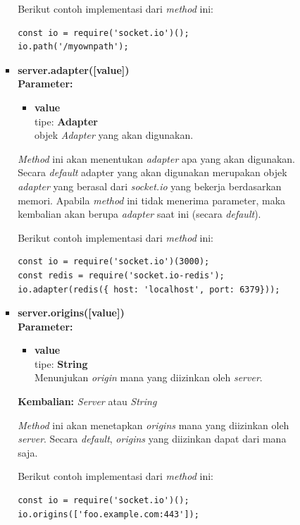 \documentclass[a4paper,twoside]{article}
\begin{document}
\begin{enumerate}
\begin{enumerate}
\begin{enumerate}
\begin{itemize}
					Berikut contoh implementasi dari \textit{method} ini:
\begin{lstlisting}
const io = require('socket.io')();
io.path('/myownpath');
\end{lstlisting}
					
					\item \textbf{server.adapter([value])} \\
					\textbf{Parameter:}
					\begin{itemize}
						\item \textbf{value} \\tipe: \textbf{Adapter} \\ objek \textit{Adapter} yang akan digunakan.
					\end{itemize}
					\textit{Method} ini akan menentukan \textit{adapter} apa yang akan digunakan. Secara \textit{default} adapter yang akan digunakan merupakan objek \textit{adapter} yang berasal dari \textit{socket.io} yang bekerja berdasarkan memori. Apabila \textit{method} ini tidak menerima parameter, maka kembalian akan berupa \textit{adapter} saat ini (secara \textit{default}).
					
					Berikut contoh implementasi dari \textit{method} ini:
\begin{lstlisting}
const io = require('socket.io')(3000);
const redis = require('socket.io-redis');
io.adapter(redis({ host: 'localhost', port: 6379}));
\end{lstlisting}
					
					\item \textbf{server.origins([value])} \\ 
					\textbf{Parameter:} 
					\begin{itemize}
						\item \textbf{value} \\tipe: \textbf{String} \\ Menunjukan \textit{origin} mana yang diizinkan oleh \textit{server}.
					\end{itemize}
					\textbf{Kembalian:} \textit{Server} atau \textit{String}
					
					\textit{Method} ini akan menetapkan \textit{origins} mana yang diizinkan oleh \textit{server}. Secara \textit{default}, \textit{origins} yang diizinkan dapat dari mana saja.
					
					Berikut contoh implementasi dari \textit{method} ini:
\begin{lstlisting}
const io = require('socket.io')();
io.origins(['foo.example.com:443']);
\end{lstlisting}
					

\end{itemize}
\end{enumerate}
\end{enumerate}
\end{enumerate}
\end{document}

